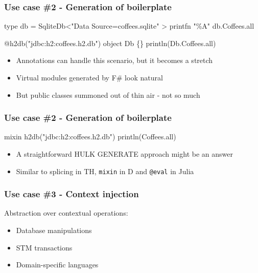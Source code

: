 \documentclass[svgnames,hyperref={bookmarks=false}]{beamer}
\begin{document}
\begin{frame}[fragile]
\frametitle{Use case \#2 - Generation of boilerplate}

\begin{semiverbatim}
type db = SqliteDb<"Data Source=coffees.sqlite" >
printfn "\%A" db.Coffees.all

\alert{@h2db("jdbc:h2:coffees.h2.db")} object Db \{\}
println(Db.Coffees.all)

\end{semiverbatim}

\begin{itemize}
\item Annotations can handle this scenario, but it becomes a stretch
\item Virtual modules generated by F\# look natural
\item But public classes summoned out of thin air - not so much
\end{itemize}
\end{frame}

\begin{frame}[fragile]
\frametitle{Use case \#2 - Generation of boilerplate}

\begin{semiverbatim}
\alert{mixin} \alert{h2db(}"jdbc:h2:coffees.h2.db"\alert{)}
println(Coffees.all)

\end{semiverbatim}

\begin{itemize}
\item A straightforward HULK GENERATE approach might be an answer
\item Similar to splicing in TH, \texttt{mixin} in D and \texttt{@eval} in Julia
\end{itemize}
\end{frame}

\begin{frame}[fragile]
\frametitle{Use case \#3 - Context injection}

Abstraction over contextual operations:
\begin{itemize}
\item Database manipulations
\item STM transactions
\item Domain-specific languages
\end{itemize}
\end{frame}
\end{document}
